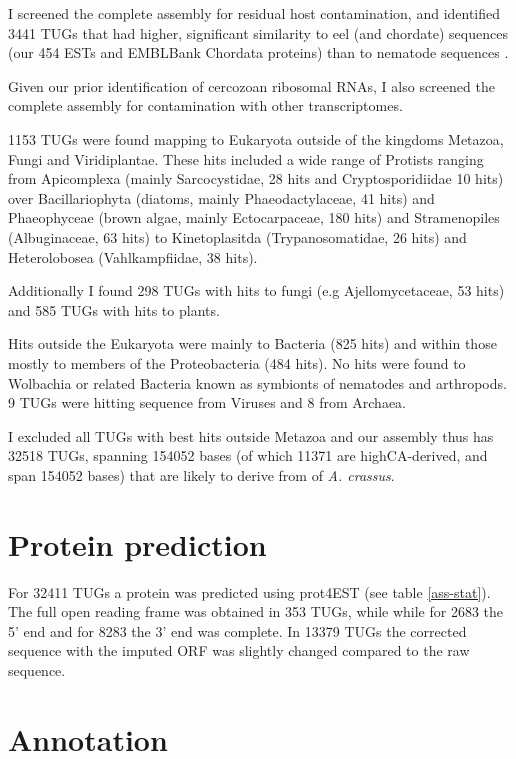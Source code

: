 \afterpage{\clearpage}

I screened the complete assembly for residual host contamination, and
identified 3441 TUGs that had higher, significant similarity to
eel (and chordate) sequences (our 454 ESTs and EMBLBank Chordata
proteins) than to nematode sequences \cite{pmid21550347}.

Given our prior identification of cercozoan ribosomal RNAs, I also
screened the complete assembly for contamination with other
transcriptomes.

1153 TUGs were found mapping to Eukaryota outside of the kingdoms
Metazoa, Fungi and Viridiplantae. These hits included a wide range of
Protists ranging from Apicomplexa (mainly Sarcocystidae, 28 hits and
Cryptosporidiidae 10 hits) over Bacillariophyta (diatoms, mainly
Phaeodactylaceae, 41 hits) and Phaeophyceae (brown algae, mainly
Ectocarpaceae, 180 hits) and Stramenopiles (Albuginaceae, 63 hits) to
Kinetoplasitda (Trypanosomatidae, 26 hits) and Heterolobosea
(Vahlkampfiidae, 38 hits).

Additionally I found 298 TUGs with hits to fungi (e.g
Ajellomycetaceae, 53 hits) and 585 TUGs with hits to plants.

Hits outside the Eukaryota were mainly to Bacteria (825 hits) and
within those mostly to members of the Proteobacteria (484 hits). No
hits were found to Wolbachia or related Bacteria known as symbionts of
nematodes and arthropods. 9 TUGs were hitting sequence from Viruses
and 8 from Archaea.

I excluded all TUGs with best hits outside Metazoa and our assembly
thus has 32518 TUGs, spanning 154052 bases (of which 11371 are
highCA-derived, and span 154052 bases) that are likely to derive from
of \textit{A. crassus}.

\section{Protein prediction}

For 32411 TUGs a protein was predicted using prot4EST
\cite{wasmuth_prot4est:_2004} (see table \ref{ass-stat}). The full
open reading frame was obtained in 353 TUGs, while while for 2683 the
5' end and for 8283 the 3' end was complete. In 13379 TUGs the
corrected sequence with the imputed ORF was slightly changed compared
to the raw sequence.

\section{Annotation}
\label{454-annot}

